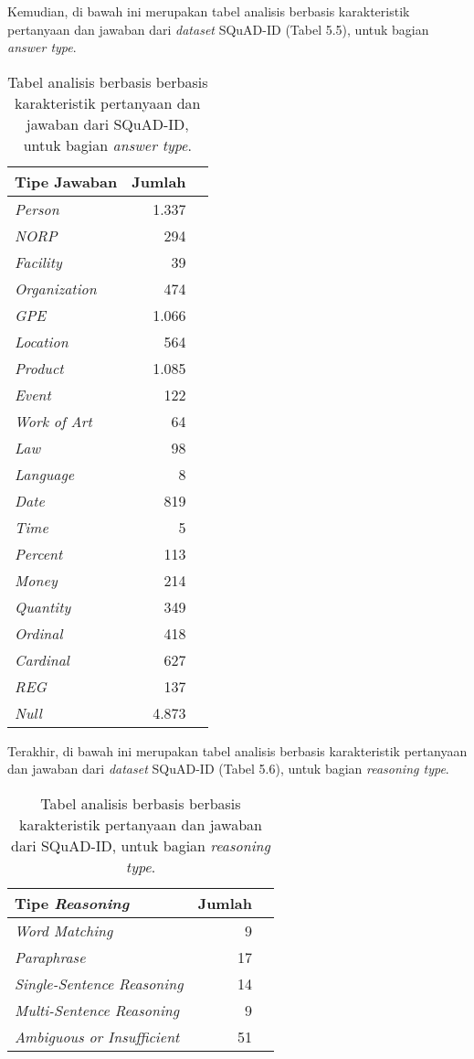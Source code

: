 Kemudian, di bawah ini merupakan tabel analisis berbasis karakteristik pertanyaan dan jawaban dari \emph{dataset} SQuAD-ID (Tabel 5.5), untuk bagian \emph{answer type}.

\begin{table}[H]\centering
\begin{tabular}{lrr}\toprule
Tipe Jawaban &Jumlah \\\midrule
\emph{Person} &  1.337\\
\emph{NORP} &  294\\
\emph{Facility} &  39\\
\emph{Organization} & 474 \\
\emph{GPE} &  1.066\\
\emph{Location} & 564\\
\emph{Product} &  1.085\\
\emph{Event} &  122\\

\emph{Work of Art} &  64\\
\emph{Law} &  98\\
\emph{Language} &  8\\
\emph{Date} &  819\\
\emph{Time} &  5\\
\emph{Percent} & 113\\
\emph{Money} &  214\\
\emph{Quantity} &  349\\

\emph{Ordinal} &  418\\
\emph{Cardinal} &  627\\
\emph{REG} &  137\\
\emph{Null} &  4.873\\
\bottomrule
\end{tabular}
\caption{Tabel analisis berbasis berbasis karakteristik pertanyaan dan jawaban dari SQuAD-ID, untuk bagian \emph{answer type}.}
\end{table}

Terakhir, di bawah ini merupakan tabel analisis berbasis karakteristik pertanyaan dan jawaban dari \emph{dataset} SQuAD-ID (Tabel 5.6), untuk bagian \emph{reasoning type}.

\begin{table}[H]\centering
\begin{tabular}{lrr}\toprule
Tipe \emph{Reasoning} &Jumlah \\\midrule
\emph{Word Matching} & 9\\
\emph{Paraphrase} & 17\\
\emph{Single-Sentence Reasoning} & 14\\
\emph{Multi-Sentence Reasoning} & 9\\
\emph{Ambiguous or Insufficient} & 51\\
\bottomrule
\end{tabular}
\caption{Tabel analisis berbasis berbasis karakteristik pertanyaan dan jawaban dari SQuAD-ID, untuk bagian \emph{reasoning type}.}
\end{table}

